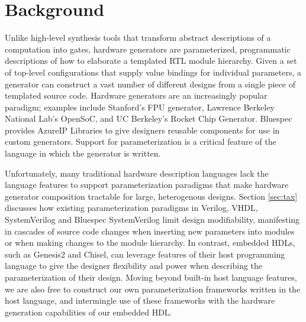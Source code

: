 \section{Background}
\label{sec:rel}

Unlike high-level synthesis tools that transform abstract descriptions of a computation into gates, hardware generators are parameterized, programmatic descriptions of how to elaborate a templated RTL module hierarchy\cite{templates}.
Given a set of top-level configurations that supply value bindings for individual parameters, a generator can construct a vast number of different designs from a single piece of templated source code.
Hardware generators are an increasingly popular paradigm; examples include Stanford's FPU generator\cite{fpu}, Lawrence Berkeley National Lab's OpenSoC\cite{opensoc}, and UC Berkeley's Rocket Chip Generator\cite{rocket}.
Bluespec provides AzureIP Libraries\cite{azure} to give designers reusable components for use in custom generators. 
Support for parameterization is a critical feature of the language in which the generator is written.

Unfortunately, many traditional hardware description languages lack the language features to support parameterization paradigms that make hardware generator composition tractable for large, heterogenous designs.
Section \ref{sec:tax} discusses how existing parameterization paradigms in Verilog, VHDL, SystemVerilog and Bluespec SystemVerilog limit design modifiability, manifesting in cascades of source code changes when inserting new parameters into modules or when making changes to the module hierarchy.
In contrast, embedded HDLs, such as Genesis2\cite{genesis2} and Chisel\cite{chisel}, can leverage features of their host programming language to give the designer flexibility and power when describing the parameterization of their design.
Moving beyond built-in host language features, we are also free to construct our own parameterization frameworks written in the host language, and intermingle use of these frameworks with the hardware generation capabilities of our embedded HDL.


